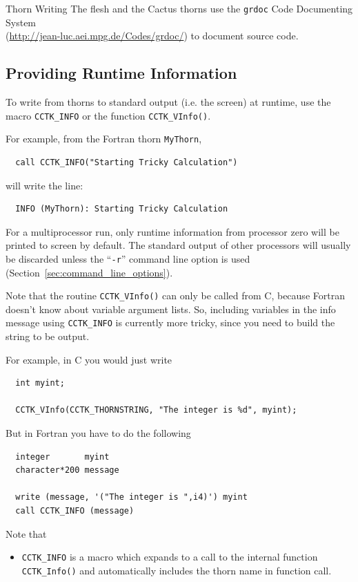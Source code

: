 \begin{cactuspart}{Thorn Writing}
The flesh and the Cactus thorns use the \texttt{grdoc} Code Documenting
System\\(\url{http://jean-luc.aei.mpg.de/Codes/grdoc/}) to document
source code.


\subsection{Providing Runtime Information}
\label{sec:prrutiin}

To write from thorns to standard output (i.e. the screen)
at runtime, use the macro \texttt{CCTK\_INFO} or the function \texttt{CCTK\_VInfo()}.

For example, from the Fortran thorn \texttt{MyThorn},
\begin{verbatim}
  call CCTK_INFO("Starting Tricky Calculation")
\end{verbatim}
%
will write the line:
\begin{verbatim}
  INFO (MyThorn): Starting Tricky Calculation
\end{verbatim}

For a multiprocessor run, only runtime information from processor zero
will be printed to screen by default. The standard output of other processors
will usually be discarded unless the ``\texttt{-r}'' command line option is used
(Section~\ref{sec:command_line_options}).

Note that the routine \texttt{CCTK\_VInfo()} can only be called from C, because
Fortran doesn't know about variable argument lists. So, including variables in
the info message using \texttt{CCTK\_INFO} is currently more tricky, since you
need to build the string to be output.

For example, in C you would just write
\begin{verbatim}
  int myint;

  CCTK_VInfo(CCTK_THORNSTRING, "The integer is %d", myint);
\end{verbatim}

But in Fortran you have to do the following
\begin{verbatim}
  integer       myint
  character*200 message

  write (message, '("The integer is ",i4)') myint
  call CCTK_INFO (message)
\end{verbatim}

Note that
\begin{itemize}
\item{} \texttt{CCTK\_INFO} is a macro which expands to a call to
        the internal function \texttt{CCTK\_Info()} and automatically includes
        the thorn name in function call.


\end{itemize}
\end{cactuspart}

